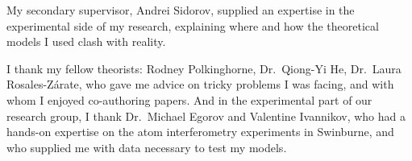 My secondary supervisor, Andrei Sidorov, supplied an expertise in the experimental side of my research, explaining where and how the theoretical models I used clash with reality.

I thank my fellow theorists: Rodney Polkinghorne, Dr.~Qiong-Yi He, Dr.~Laura Rosales-Z\'arate, who gave me advice on tricky problems I was facing, and with whom I enjoyed co-authoring papers.
And in the experimental part of our research group, I thank Dr.~Michael Egorov and Valentine Ivannikov, who had a hands-on expertise on the atom interferometry experiments in Swinburne, and who supplied me with data necessary to test my models.
